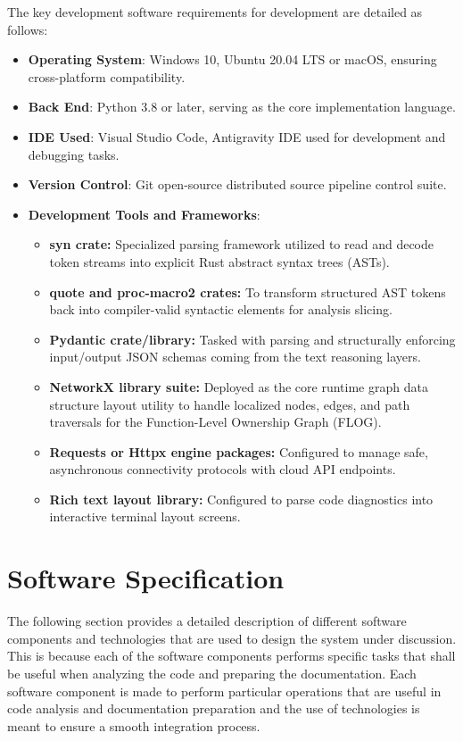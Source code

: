 The key development software requirements for development are detailed as follows:
\begin{itemize}
    \item \textbf{Operating System}: Windows 10, Ubuntu 20.04 LTS or macOS, ensuring cross-platform compatibility.
    
    \item \textbf{Back End}: Python 3.8 or later, serving as the core implementation language.
    
    \item \textbf{IDE Used}: Visual Studio Code, Antigravity IDE used for development and debugging tasks.
    
    \item \textbf{Version Control}: Git open-source distributed source pipeline control suite.
    
    \item \textbf{Development Tools and Frameworks}:
    \begin{itemize}
        \item \textbf{syn crate:} Specialized parsing framework utilized to read and decode token streams into explicit Rust abstract syntax trees (ASTs).
        \item \textbf{quote and proc-macro2 crates:} To transform structured AST tokens back into compiler-valid syntactic elements for analysis slicing.
        \item \textbf{Pydantic crate/library:} Tasked with parsing and structurally enforcing input/output JSON schemas coming from the text reasoning layers.
        \item \textbf{NetworkX library suite:} Deployed as the core runtime graph data structure layout utility to handle localized nodes, edges, and path traversals for the Function-Level Ownership Graph (FLOG).
        \item \textbf{Requests or Httpx engine packages:} Configured to manage safe, asynchronous connectivity protocols with cloud API endpoints.
        \item \textbf{Rich text layout library:} Configured to parse code diagnostics into interactive terminal layout screens.
    \end{itemize}
\end{itemize}
\section{Software Specification}
\hspace{0.5cm}The following section provides a detailed description of different software components and technologies that are used to design the system under discussion. This is because each of the software components performs specific tasks that shall be useful when analyzing the code and preparing the documentation. Each software component is made to perform particular operations that are useful in code analysis and documentation preparation and the use of technologies is meant to ensure a smooth integration process. 

